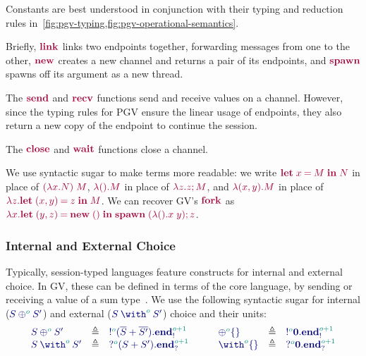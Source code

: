 Constants are best understood in conjunction with their typing and reduction rules in~\cref{fig:pgv-typing,fig:pgv-operational-semantics}.

Briefly, $\tm{\link}$ links two endpoints together, forwarding messages from one to the other, $\tm{\new}$ creates a new channel and returns a pair of its endpoints, and $\tm{\spawn}$ spawns off its argument as a new thread.

The $\tm{\send}$ and $\tm{\recv}$ functions send and receive values on a channel.
However, since the typing rules for PGV ensure the linear usage of endpoints, they also return a new copy of the endpoint to continue the session.

The $\tm{\close}$ and $\tm{\wait}$ functions close a channel.

We use syntactic sugar to make terms more readable: we write $\tm{\letbind{x}{M}{N}}$ in place of $\tm{(\lambda x.N)\;M}$, $\tm{\lambda\unit.M}$ in place of $\tm{\lambda z.\andthen{z}{M}}$, and $\tm{\lambda\pair{x}{y}.M}$ in place of $\tm{\lambda z.\letpair{x}{y}{z}{M}}$.
We can recover GV's $\tm{\fork}$ as $\tm{\lambda x.\letpair{y}{z}{\new\;\unit}{\andthen{\spawn\;{(\lambda\unit.x\;y)}}{z}}}$.

\subsubsection*{Internal and External Choice}
Typically, session-typed languages feature constructs for internal and external choice. In GV, these can be defined in terms of the core language, by sending or receiving a value of a sum type~\cite{lindleymorris15}. We use the following syntactic sugar for internal ($\ty{\tyselect[\cs{o}]{S}{S'}}$) and external ($\ty{\tyoffer[\cs{o}]{S}{S'}}$) choice and their units:
\[
  \begin{array}{lcl}
    \ty{\tyselect[\cs{o}]{S}{S'}}
     & \elabarrow & \ty{\tysend[\cs{o}]{(\tysum{\co{S}}{\co{S'}})}{\tyends[\cs{o+1}]}} \\
    \ty{\tyoffer[\cs{o}]{S}{S'}}
     & \elabarrow & \ty{\tyrecv[\cs{o}]{(\tysum{S}{S'})}{\tyendr[\cs{o+1}]}}           \\
  \end{array}
  \qquad
  \begin{array}{lcl}
    \ty{\tyselectemp[\cs{o}]}
     & \elabarrow & \ty{\tysend[\cs{o}]{\tyvoid}{\tyends[\cs{o+1}]}} \\
    \ty{\tyofferemp[\cs{o}]}
     & \elabarrow & \ty{\tyrecv[\cs{o}]{\tyvoid}{\tyendr[\cs{o+1}]}} \\
  \end{array}
\]

